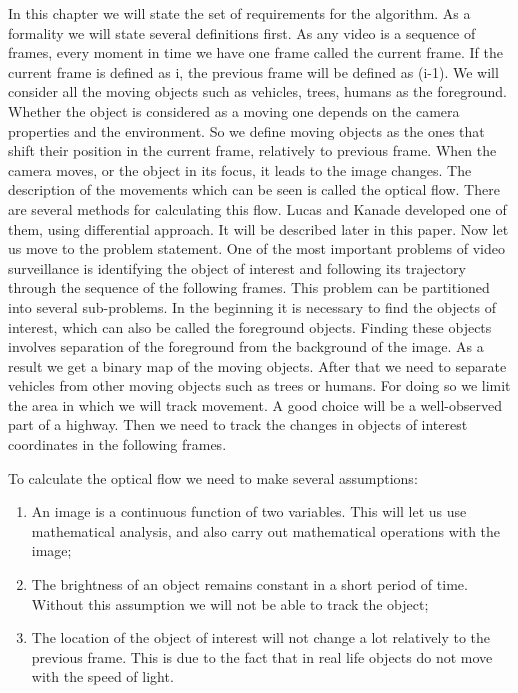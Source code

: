 \documentclass[12pt,a4paper,oneside,titlepage]{article}
\begin{document}
In this chapter we will state the set of requirements for the algorithm.
As a formality we will state several definitions first.
As any video is a sequence of frames, every moment in time we have one frame called the current frame.
If the current frame is defined as i, the previous frame will be defined as (i-1).
We will consider all the moving objects such as vehicles, trees, humans as the foreground.
Whether the object is considered as a moving one depends on the camera properties and the environment.
So we define moving objects as the ones that shift their position in the current frame, relatively to previous frame.
When the camera moves, or the object in its focus, it leads to the image changes.
The description of the movements which can be seen is called the optical flow.
There are several methods for calculating this flow.
Lucas and Kanade developed one of them, using differential approach.
It will be described later in this paper.
Now let us move to the problem statement.
One of the most important problems of video surveillance is identifying the object of interest and following its trajectory through the sequence of the following frames.
This problem can be partitioned into several sub-problems.
In the beginning it is necessary to find the objects of interest, which can also be called the foreground objects.
Finding these objects involves separation of the foreground from the background of the image.
As a result we get a binary map of the moving objects.
After that we need to separate vehicles from other moving objects such as trees or humans. 
For doing so we limit the area in which we will track movement.
A good choice will be a well-observed part of a highway. 
Then we need to track the changes in objects of interest coordinates in the following frames.

To calculate the optical flow we need to make several assumptions:
\begin{enumerate}
  \item An image is a continuous function of two variables. This will let us use mathematical analysis, and also carry out mathematical operations with the image;
  \item The brightness of an object remains constant in a short period of time. Without this assumption we will not be able to track the object;
  \item The location of the object of interest will not change a lot relatively to the previous frame. This is due to the fact that in real life objects do not move with the speed of light.
\end{enumerate}
\end{document}
